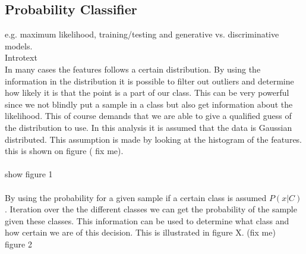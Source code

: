 \subsection{Probability Classifier}

e.g. maximum likelihood, training/testing and generative vs. discriminative models.\\

Introtext\\

In many cases the features follows a certain distribution. By using the information in the distribution it is possible to filter out outliers and determine how likely it is that the point is a part of our class. This can be very powerful since we not blindly put a sample in a class but also get information about the likelihood. This of course demands that we are able to give a qualified guess of the distribution to use. In this analysis it is assumed that the data is Gaussian distributed. This assumption is made by looking at the histogram of the features. this is shown on figure ( fix me).\\\\


show figure 1\\\\


By using the probability for a given sample if a certain class is assumed $P(x|C)$. Iteration over the the different classes we can get the probability of the sample given these classes. This information can be used to determine what class and how certain we are of this decision. 
This is illustrated in figure X. (fix me)\\

figure 2\\


